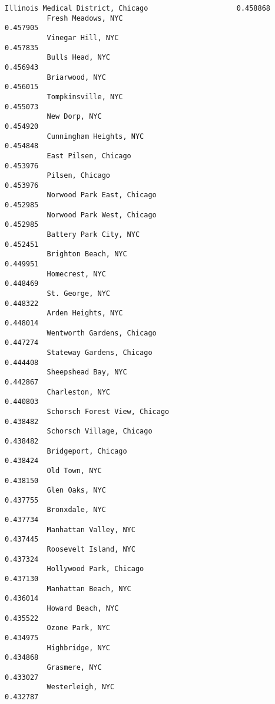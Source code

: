 \documentclass[11pt]{article}
\begin{document}
\begin{Verbatim}[commandchars=\\\{\}]
          Illinois Medical District, Chicago                     0.458868
          Fresh Meadows, NYC                                     0.457905
          Vinegar Hill, NYC                                      0.457835
          Bulls Head, NYC                                        0.456943
          Briarwood, NYC                                         0.456015
          Tompkinsville, NYC                                     0.455073
          New Dorp, NYC                                          0.454920
          Cunningham Heights, NYC                                0.454848
          East Pilsen, Chicago                                   0.453976
          Pilsen, Chicago                                        0.453976
          Norwood Park East, Chicago                             0.452985
          Norwood Park West, Chicago                             0.452985
          Battery Park City, NYC                                 0.452451
          Brighton Beach, NYC                                    0.449951
          Homecrest, NYC                                         0.448469
          St. George, NYC                                        0.448322
          Arden Heights, NYC                                     0.448014
          Wentworth Gardens, Chicago                             0.447274
          Stateway Gardens, Chicago                              0.444408
          Sheepshead Bay, NYC                                    0.442867
          Charleston, NYC                                        0.440803
          Schorsch Forest View, Chicago                          0.438482
          Schorsch Village, Chicago                              0.438482
          Bridgeport, Chicago                                    0.438424
          Old Town, NYC                                          0.438150
          Glen Oaks, NYC                                         0.437755
          Bronxdale, NYC                                         0.437734
          Manhattan Valley, NYC                                  0.437445
          Roosevelt Island, NYC                                  0.437324
          Hollywood Park, Chicago                                0.437130
          Manhattan Beach, NYC                                   0.436014
          Howard Beach, NYC                                      0.435522
          Ozone Park, NYC                                        0.434975
          Highbridge, NYC                                        0.434868
          Grasmere, NYC                                          0.433027
          Westerleigh, NYC                                       0.432787

\end{Verbatim}
\end{document}
